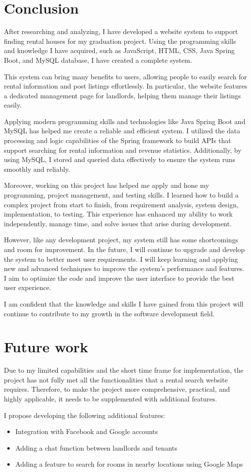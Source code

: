 \documentclass[../Main.tex]{subfiles}
\begin{document}
\section{Conclusion}
After researching and analyzing, I have developed a website system to support finding rental houses for my graduation project.
Using the programming skills and knowledge I have acquired, such as JavaScript, HTML, CSS, Java Spring Boot, and MySQL database, I have created a complete system.

This system can bring many benefits to users, allowing people to easily search for rental information and post listings effortlessly.
In particular, the website features a dedicated management page for landlords, helping them manage their listings easily.

Applying modern programming skills and technologies like Java Spring Boot and MySQL has helped me create a reliable and efficient system.
I utilized the data processing and logic capabilities of the Spring framework to build APIs that support searching for rental information and revenue statistics.
Additionally, by using MySQL, I stored and queried data effectively to ensure the system runs smoothly and reliably.

Moreover, working on this project has helped me apply and hone my programming, project management, and testing skills.
I learned how to build a complex project from start to finish, from requirement analysis, system design, implementation, to testing.
This experience has enhanced my ability to work independently, manage time, and solve issues that arise during development.

However, like any development project, my system still has some shortcomings and room for improvement.
In the future, I will continue to upgrade and develop the system to better meet user requirements.
I will keep learning and applying new and advanced techniques to improve the system's performance and features.
I aim to optimize the code and improve the user interface to provide the best user experience.

I am confident that the knowledge and skills I have gained from this project will continue to contribute to my growth in the software development field.

\section{Future work}
Due to my limited capabilities and the short time frame for implementation, the project has not fully met all the functionalities that a rental search website requires.
Therefore, to make the project more comprehensive, practical, and highly applicable, it needs to be supplemented with additional features.

I propose developing the following additional features:

\begin{itemize}
    \item Integration with Facebook and Google accounts
    \item Adding a chat function between landlords and tenants
    \item Adding a feature to search for rooms in nearby locations using Google Maps
\end{itemize}
\end{document}
